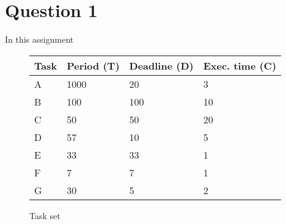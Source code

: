 \section{Question 1}

In this assignment 

    \renewcommand{\arraystretch}{1.4}
        \begin{figure}[H]
        \centering
        \begin{minipage}{0.5\textwidth}
            \begin{table}[H]
            \centering
                \begin{tabular}{|l|l|l|l|}
                \hline
                \rowcolor{green!40}\textbf{Task} & \textbf{Period (T)} & \textbf{Deadline (D)} & \textbf{Exec. time (C)} \\ \hline
                A   & 1000  & 20    & 3     \\ \hline
                B   & 100   & 100   & 10    \\ \hline
                C   & 50    & 50    & 20    \\ \hline
                D   & 57    & 10    & 5     \\ \hline
                E   & 33    & 33    & 1     \\ \hline
                F   & 7     & 7     & 1     \\ \hline
                G   & 30    & 5     & 2     \\ \hline
                \end{tabular}
            \end{table}
        \end{minipage}
        \caption{Task set}
        \label{fig:tasks}
        \end{figure}
    \renewcommand{\arraystretch}{1.0}

